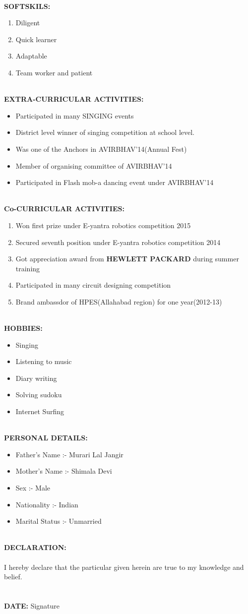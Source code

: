 \documentclass[10pt]{report}
\begin{document}
    \qquad\\  
\textbf{SOFTSKILS:}
    \begin{enumerate}
    \item Diligent
    \item Quick learner
    \item Adaptable
    \item Team worker and patient
    \end{enumerate}   
    \qquad\\
\textbf{EXTRA-CURRICULAR ACTIVITIES:}
    \begin{itemize}
    \item Participated in many SINGING events
    \item District level winner of singing competition at school level. 
    \item Was one of the Anchors in AVIRBHAV'14(Annual Fest)
    \item Member of organising committee of AVIRBHAV'14
    \item Participated in Flash mob-a dancing event under AVIRBHAV'14
    \end{itemize}  
    \qquad\\
\textbf{Co-CURRICULAR ACTIVITIES:}
    \begin{enumerate}
    \item Won first prize under E-yantra robotics competition 2015
    \item Secured seventh position under E-yantra robotics competition 2014
    \item Got appreciation award from \textbf{HEWLETT PACKARD} during summer training
    \item Participated in many circuit designing competition
    \item Brand ambassdor of HPES(Allahabad region) for one year(2012-13) 
    \end{enumerate}   
    \qquad\\
\textbf{HOBBIES:}
   \begin{itemize}
   \item Singing
   \item Listening to music
   \item Diary writing
   \item Solving sudoku
   \item Internet Surfing
   \end{itemize}       
   \qquad\\
\textbf{PERSONAL DETAILS:}
   \begin{itemize}
   \item Father's Name :- Murari Lal Jangir
   \item Mother's Name :- Shimala Devi
   \item Sex :- Male
   \item Nationality :- Indian
   \item Marital Status :- Unmarried
   \end{itemize}
   \qquad\\ 
\textbf{DECLARATION:}
\\ \\ I hereby declare that the particular given herein are true to my knowledge and belief. \\ \\ \\
\textbf{DATE: } \qquad\qquad\qquad\qquad\qquad\qquad\qquad\qquad\qquad\qquad\qquad\qquad\qquad Signature
\end{document}
